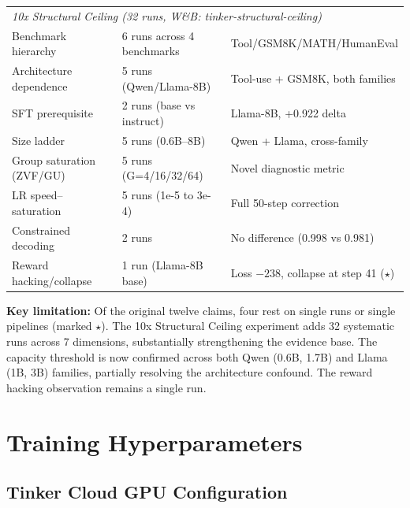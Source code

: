 \documentclass{article}
\begin{document}
\begin{table}[htbp]
\begin{tabular}{p{3.8cm}lp{4.5cm}}
        \midrule
        \multicolumn{3}{l}{\emph{10x Structural Ceiling (32 runs, W\&B: tinker-structural-ceiling)}} \\
        Benchmark hierarchy & 6 runs across 4 benchmarks & Tool/GSM8K/MATH/HumanEval \\
        Architecture dependence & 5 runs (Qwen/Llama-8B) & Tool-use + GSM8K, both families \\
        SFT prerequisite & 2 runs (base vs instruct) & Llama-8B, +0.922 delta \\
        Size ladder & 5 runs (0.6B--8B) & Qwen + Llama, cross-family \\
        Group saturation (ZVF/GU) & 5 runs (G=4/16/32/64) & Novel diagnostic metric \\
        LR speed--saturation & 5 runs (1e-5 to 3e-4) & Full 50-step correction \\
        Constrained decoding & 2 runs & No difference (0.998 vs 0.981) \\
        Reward hacking/collapse & 1 run (Llama-8B base) & Loss $-238$, collapse at step 41 ($\star$) \\
        \bottomrule
    \end{tabular}
    \label{tab:claim_map}
\end{table}

\textbf{Key limitation:} Of the original twelve claims, four rest on single runs or single pipelines (marked $\star$). The 10x Structural Ceiling experiment adds 32 systematic runs across 7 dimensions, substantially strengthening the evidence base. The capacity threshold is now confirmed across both Qwen (0.6B, 1.7B) and Llama (1B, 3B) families, partially resolving the architecture confound. The reward hacking observation remains a single run.

\section{Training Hyperparameters}

\subsection{Tinker Cloud GPU Configuration}
\end{document}
